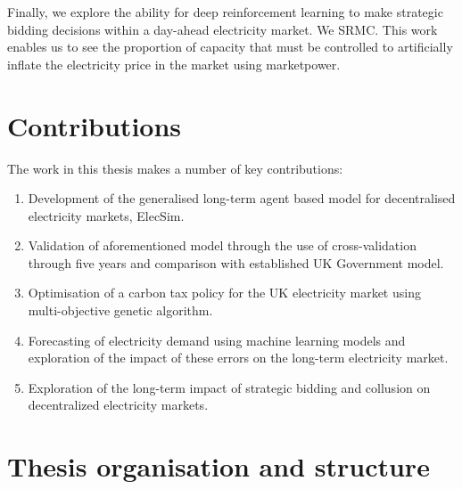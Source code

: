 Finally, we explore the ability for deep reinforcement learning to make strategic bidding decisions within a day-ahead electricity market. We \gls{SRMC}. This work enables us to see the proportion of capacity that must be controlled to artificially inflate the electricity price in the market using \gls{marketpower}. 

\section{Contributions}

The work in this thesis makes a number of key contributions:

\begin{enumerate}
	\item Development of the generalised long-term agent based model for decentralised electricity markets, ElecSim.
	\item Validation of aforementioned model through the use of cross-validation through five years and comparison with established UK Government model.
	\item Optimisation of a carbon tax policy for the UK electricity market using multi-objective genetic algorithm.
	\item Forecasting of electricity demand using machine learning models and exploration of the impact of these errors on the long-term electricity market.
	\item Exploration of the long-term impact of strategic bidding and collusion on decentralized electricity markets.
\end{enumerate}

\section{Thesis organisation and structure}


